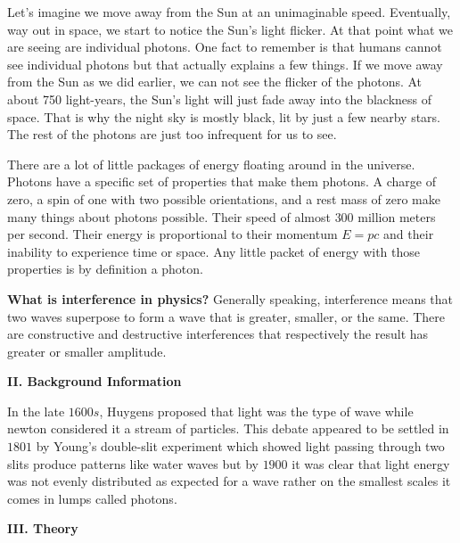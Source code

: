 \documentclass[fleqn]{article}
\begin{document}
  Let’s imagine we move away from the Sun at an unimaginable speed. Eventually, way out in space, we start to notice the Sun’s light 
  flicker. At that point what we are seeing are individual photons. One fact to remember is that humans cannot see individual 
  photons but that actually explains a few things. If we move away from the Sun as we did earlier, we can not see the flicker 
  of the photons. At about 750 light-years, the Sun’s light will just fade away into the blackness of space. That is why the night
  sky is mostly black, lit by just a few nearby stars. The rest of the photons are just too infrequent for us to see.

  There are a lot of little packages of energy floating around in the universe. Photons have a specific set of properties that make 
  them photons. A charge of zero, a spin of one with two possible orientations, and a rest mass of zero make many things about photons 
  possible. Their speed of almost $300$ million meters per second. Their energy is proportional to their momentum $E=pc$ and 
  their inability to experience time or space. Any little packet of energy with those properties is by definition a photon.

  \pagebreak

  \textbf{What is interference in physics?} Generally speaking, interference means that two waves superpose to form a wave that is 
  greater, smaller, or the same.\textcite{Two} There are constructive and destructive interferences that respectively the 
  result has greater or smaller amplitude.  

  \vspace{20px}


  \textbf{II. Background Information}

  \vspace{10px}

  In the late $1600s$, Huygens proposed that light was the type of wave while newton considered it a stream of particles. 
  This debate appeared to be settled in $1801$ by Young's double-slit experiment which showed light passing through two 
  slits produce patterns like water waves but by $1900$ it was clear that light energy was not evenly distributed as expected for 
  a wave rather on the smallest scales it comes in lumps called photons. 
  
  \vspace{20px}



  \textbf{III. Theory}
\end{document}

